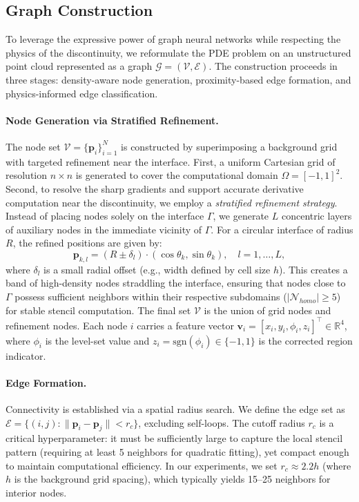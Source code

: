 \documentclass[11pt]{article}
\theoremstyle{definition}
\theoremstyle{remark}
\theoremstyle{plain}
\begin{document}
\subsection{Graph Construction}
\label{sec:graph_construction}

To leverage the expressive power of graph neural networks while respecting the physics of the discontinuity, we reformulate the PDE problem on an unstructured point cloud represented as a graph $\mathcal{G} = (\mathcal{V}, \mathcal{E})$. The construction proceeds in three stages: density-aware node generation, proximity-based edge formation, and physics-informed edge classification.

\paragraph{Node Generation via Stratified Refinement.}
The node set $\mathcal{V} = \{\mathbf{p}_i\}_{i=1}^{N}$ is constructed by superimposing a background grid with targeted refinement near the interface. First, a uniform Cartesian grid of resolution $n \times n$ is generated to cover the computational domain $\Omega = [-1,1]^2$. Second, to resolve the sharp gradients and support accurate derivative computation near the discontinuity, we employ a \textit{stratified refinement strategy}. Instead of placing nodes solely on the interface $\Gamma$, we generate $L$ concentric layers of auxiliary nodes in the immediate vicinity of $\Gamma$. For a circular interface of radius $R$, the refined positions are given by:
\begin{equation}
    \mathbf{p}_{k,l} = (R \pm \delta_l) \cdot (\cos\theta_k, \sin\theta_k), \quad l=1,\dots,L,
\end{equation}
where $\delta_l$ is a small radial offset (e.g., width defined by cell size $h$). This creates a band of high-density nodes straddling the interface, ensuring that nodes close to $\Gamma$ possess sufficient neighbors within their respective subdomains ($|\mathcal{N}_{homo}| \ge 5$) for stable stencil computation. The final set $\mathcal{V}$ is the union of grid nodes and refinement nodes. Each node $i$ carries a feature vector $\mathbf{v}_i = [x_i, y_i, \phi_i, z_i]^\top \in \mathbb{R}^4$, where $\phi_i$ is the level-set value and $z_i = \text{sgn}(\phi_i) \in \{-1, 1\}$ is the corrected region indicator.

\paragraph{Edge Formation.}
Connectivity is established via a spatial radius search. We define the edge set as $\mathcal{E} = \{(i, j) : \|\mathbf{p}_i - \mathbf{p}_j\| < r_c\}$, excluding self-loops. The cutoff radius $r_c$ is a critical hyperparameter: it must be sufficiently large to capture the local stencil pattern (requiring at least 5 neighbors for quadratic fitting), yet compact enough to maintain computational efficiency. In our experiments, we set $r_c \approx 2.2 h$ (where $h$ is the background grid spacing), which typically yields 15--25 neighbors for interior nodes.
\end{document}
